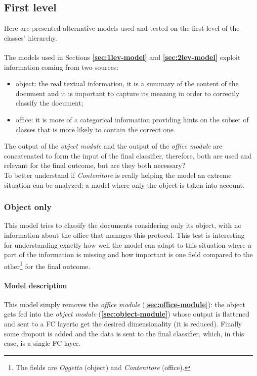 \documentclass[12pt]{article}
\begin{document}
\subsection{First level}\label{sec:altern_lev1}
Here are presented alternative models used and tested on the first level of the classes' hierarchy.\\\\
The models used in Sections \textbf{\ref{sec:1lev-model}} and \textbf{\ref{sec:2lev-model}} exploit information coming from two sources:
\begin{itemize}
    \item object: the real textual information, it is a summary of the content of the document and it is important to capture its meaning in order to correctly classify the document;
    \item office: it is more of a categorical information providing hints on the subset of classes that is more likely to contain the correct one.
\end{itemize}
The output of the \textit{object module} and the output of the \textit{office module} are concatenated to form the input of the final classifier, therefore, both are used and relevant for the final outcome, but are they both necessary?\\
To better understand if \textit{Contenitore} is really helping the model an extreme situation can be analyzed: a model where only the object is taken into account.

\subsubsection{Object only}\label{sec:obj_only}
This model tries to classify the documents considering only its object, with no information about the office that manages this protocol. This test is interesting for understanding exactly how well the model can adapt to this situation where a part of the information is missing and how important is one field compared to the other\footnote{The fields are \textit{Oggetto} (object) and \textit{Contenitore} (office).}
for the final outcome.
\paragraph{Model description}
This model simply removes the \textit{office module} (\textbf{\ref{sec:office-module}}): the object gets fed into the \textit{object module} (\textbf{\ref{sec:object-module}}) whose output is flattened and sent to a FC layer to get the desired dimensionality (it is reduced).
Finally some dropout is added and the data is sent to the final classifier, which, in this case, is a single FC layer.
\end{document}
